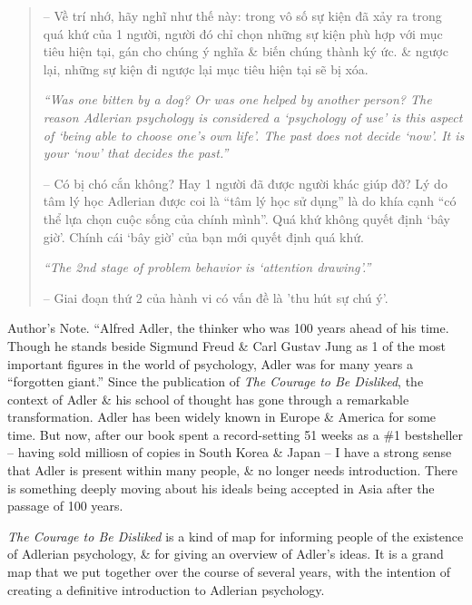 \documentclass{article}
\begin{document}
\begin{enumerate}
\begin{quotation}
		-- Về trí nhớ, hãy nghĩ như thế này: trong vô số sự kiện đã xảy ra trong quá khứ của 1 người, người đó chỉ chọn những sự kiện phù hợp với mục tiêu hiện tại, gán cho chúng ý nghĩa \& biến chúng thành ký ức. \& ngược lại, những sự kiện đi ngược lại mục tiêu hiện tại sẽ bị xóa.

		{\it``Was one bitten by a dog? Or was one helped by another person? The reason Adlerian psychology is considered a `psychology of use' is this aspect of `being able to choose one's own life'. The past does not decide `now'. It is your `now' that decides the past.''}

		-- Có bị chó cắn không? Hay 1 người đã được người khác giúp đỡ? Lý do tâm lý học Adlerian được coi là ``tâm lý học sử dụng'' là do khía cạnh ``có thể lựa chọn cuộc sống của chính mình''. Quá khứ không quyết định ‘bây giờ'. Chính cái ‘bây giờ' của bạn mới quyết định quá khứ.

		{\it``The 2nd stage of problem behavior is `attention drawing'.''}

		-- Giai đoạn thứ 2 của hành vi có vấn đề là 'thu hút sự chú ý'.
	\end{quotation}
	{\sf Author's Note.}  ``{\sc Alfred Adler}, the thinker who was 100 years ahead of his time. Though he stands beside {\sf Sigmund Freud} \& {\sc Carl Gustav Jung} as 1 of the most important figures in the world of psychology, {\sc Adler} was for many years a ``forgotten giant.'' Since the publication of {\it The Courage to Be Disliked}, the context of {\sc Adler} \& his school of thought has gone through a remarkable transformation. {\sc Adler} has been widely known in Europe \& America for some time. But now, after our book spent a record-setting 51 weeks as a \#1 bestsheller -- having sold milliosn of copies in South Korea \& Japan -- I have a strong sense that {\sc Adler} is present within many people, \& no longer needs introduction. There is something deeply moving about his ideals being accepted in Asia after the passage of 100 years.

	{\it The Courage to Be Disliked} is a kind of map for informing people of the existence of Adlerian psychology, \& for giving an overview of {\sc Adler}'s ideas. It is a grand map that we put together over the course of several years, with the intention of creating a definitive introduction to Adlerian psychology.


\end{enumerate}
\end{document}
